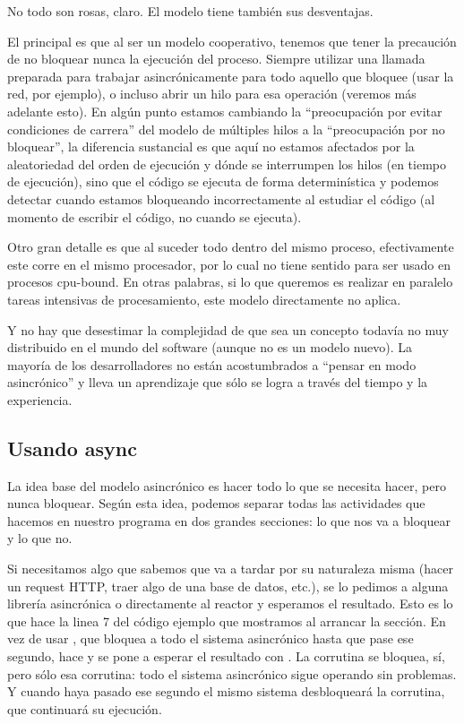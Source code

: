 No todo son rosas, claro. El modelo tiene también sus desventajas. 

El principal es que al ser un modelo cooperativo, tenemos que tener la precaución de no bloquear nunca la ejecución del proceso. Siempre utilizar una llamada preparada para trabajar asincrónicamente para todo aquello que bloquee (usar la red, por ejemplo), o incluso abrir un hilo para esa operación (veremos más adelante esto). En algún punto estamos cambiando la ``preocupación por evitar condiciones de carrera'' del modelo de múltiples hilos a la ``preocupación por no bloquear'', la diferencia sustancial es que aquí no estamos afectados por la aleatoriedad del orden de ejecución y dónde se interrumpen los hilos (en tiempo de ejecución), sino que el código se ejecuta de forma determinística y podemos detectar cuando estamos bloqueando incorrectamente al estudiar el código (al momento de escribir el código, no cuando se ejecuta).

Otro gran detalle es que al suceder todo dentro del mismo proceso, efectivamente este corre en el mismo procesador, por lo cual no tiene sentido para ser usado en procesos cpu-bound. En otras palabras, si lo que queremos es realizar en paralelo tareas intensivas de procesamiento, este modelo directamente no aplica.

Y no hay que desestimar la complejidad de que sea un concepto todavía no muy distribuido en el mundo del software (aunque no es un modelo nuevo). La mayoría de los desarrolladores no están acostumbrados a ``pensar en modo asincrónico'' y lleva un aprendizaje que sólo se logra a través del tiempo y la experiencia.

\subsection{Usando async}\label{sub:usando-async}

La idea base del modelo asincrónico es hacer todo lo que se necesita hacer, pero nunca bloquear. Según esta idea, podemos separar todas las actividades que hacemos en nuestro programa en dos grandes secciones: lo que nos va a bloquear y lo que no.

Si necesitamos algo que sabemos que va a tardar por su naturaleza misma (hacer un request HTTP, traer algo de una base de datos, etc.), se lo pedimos a alguna librería asincrónica o directamente al reactor y esperamos el resultado. Esto es lo que hace la linea 7 del código ejemplo que mostramos al arrancar la sección. En vez de usar , que bloquea a todo el sistema asincrónico hasta que pase ese segundo, hace  y se pone a esperar el resultado con . La corrutina se bloquea, sí, pero sólo esa corrutina: todo el sistema asincrónico sigue operando sin problemas. Y cuando haya pasado ese segundo el mismo sistema desbloqueará la corrutina, que continuará su ejecución.

